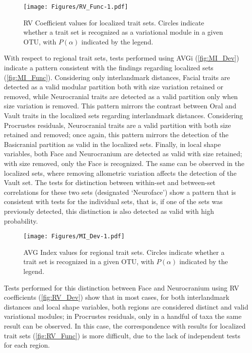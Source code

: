 \documentclass[11pt,twoside]{report}
\begin{document}
\begin{figure}[htbp]
\centering
\texttt{[image: Figures/RV\_Func-1.pdf]}
\caption{RV Coefficient values for localized trait sets. Circles
indicate whether a trait set is recognized as a variational module in a
given OTU, with $P(\alpha)$ indicated by the legend.
\label{fig:RV_Func}}
\end{figure}

With respect to regional trait sets, tests performed using AVGi
(\autoref{fig:MI_Dev}) indicate a pattern consistent with the findings
regarding localized sets (\autoref{fig:MI_Func}). Considering only
interlandmark distances, Facial traits are detected as a valid modular
partition both with size variation retained or removed, while
Neurocranial traits are detected as a valid partition only when size
variation is removed. This pattern mirrors the contrast between Oral and
Vault traits in the localized sets regarding interlandmark distances.
Considering Procrustes residuals, Neurocranial traits are a valid
partition with both size retained and removed; once again, this pattern
mirrors the detection of the Basicranial partition as valid in the
localized sets. Finally, in local shape variables, both Face and
Neurocranium are detected as valid with size retained; with size
removed, only the Face is recognized. The same can be observed in the
localized sets, where removing allometric variation affects the
detection of the Vault set. The tests for distinction between within-set
and between-set correlations for these two sets (designated `Neuroface')
show a pattern that is consistent with tests for the individual sets,
that is, if one of the sets was previously detected, this distinction is
also detected as valid with high probability.

\begin{figure}[htbp]
\centering
\texttt{[image: Figures/MI\_Dev-1.pdf]}
\caption{AVG Index values for regional trait sets. Circles indicate
whether a trait set is recognized in a given OTU, with $P(\alpha)$
indicated by the legend. \label{fig:MI_Dev}}
\end{figure}

Tests performed for this distinction between Face and Neurocranium using
RV coefficients (\autoref{fig:RV_Dev}) show that in most cases, for both
interlandmark distances and local shape variables, both regions are
considered distinct and valid variational modules; in Procrustes
residuals, only in a handful of taxa the same result can be observed. In
this case, the correspondence with results for localized trait sets
(\autoref{fig:RV_Func}) is more difficult, due to the lack of
independent tests for each region.
\end{document}
